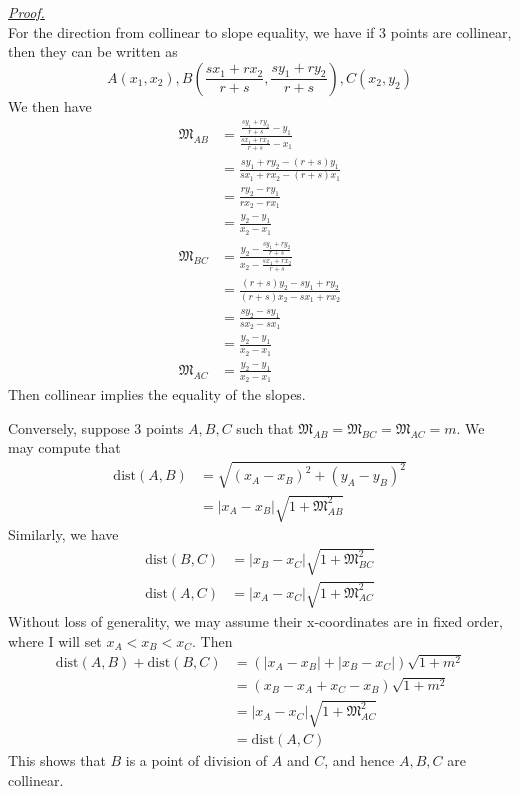 \documentclass[12pt]{article}
\renewenvironment{proof}[1][Proof]{\begin{snugshade*} \underline{\textit{{#1}.}}\\}{\hfill \qedsymbol \end{snugshade*}}
\begin{document}
    \begin{proof}
        For the direction from collinear to slope equality, we have if 3 points are collinear, then they can be written as $$A(x_1,x_2), B(\frac{sx_1+rx_2}{r+s}, \frac{sy_1+ry_2}{r+s}), C(x_2,y_2)$$
        We then have \begin{align*}
            \mathfrak{M}_{AB}&=\frac{\frac{sy_1+ry_2}{r+s}-y_1}{\frac{sx_1+rx_2}{r+s}-x_1}\\
            &=\frac{sy_1+ry_2-(r+s)y_1}{sx_1+rx_2-(r+s)x_1}\\
            &=\frac{ry_2-ry_1}{rx_2-rx_1}\\
            &=\frac{y_2-y_1}{x_2-x_1}\\
            \mathfrak{M}_{BC}&=\frac{y_2-\frac{sy_1+ry_2}{r+s}}{x_2-\frac{sx_1+rx_2}{r+s}}\\
            &=\frac{(r+s)y_2-sy_1+ry_2}{(r+s)x_2-sx_1+rx_2}\\
            &=\frac{sy_2-sy_1}{sx_2-sx_1}\\
            &=\frac{y_2-y_1}{x_2-x_1}\\
            \mathfrak{M}_{AC}&=\frac{y_2-y_1}{x_2-x_1}
        \end{align*}
        Then collinear implies the equality of the slopes.

        Conversely, suppose 3 points $A,B,C$ such that $\mathfrak{M}_{AB}=\mathfrak{M}_{BC}=\mathfrak{M}_{AC}=m$. We may compute that \begin{align*}
            \mathrm{dist}(A,B)&=\sqrt{(x_A-x_B)^2+(y_A-y_B)^2}\\
            &=|x_A-x_B|\sqrt{1+\mathfrak{M}_{AB}^2}
        \end{align*}
        Similarly, we have \begin{align*}
            \mathrm{dist}(B,C)&=|x_B-x_C|\sqrt{1+\mathfrak{M}_{BC}^2}\\
            \mathrm{dist}(A,C)&=|x_A-x_C|\sqrt{1+\mathfrak{M}_{AC}^2}
        \end{align*}
        Without loss of generality, we may assume their x-coordinates are in fixed order, where I will set $x_A<x_B<x_C$. Then \begin{align*}
            \mathrm{dist}(A,B)+\mathrm{dist}(B,C)&=(|x_A-x_B|+|x_B-x_C|)\sqrt{1+m^2}\\
            &=(x_B-x_A+x_C-x_B)\sqrt{1+m^2}\\
            &=|x_A-x_C|\sqrt{1+\mathfrak{M}_{AC}^2}\\
            &=\mathrm{dist}(A,C)
        \end{align*}
        This shows that $B$ is a point of division of $A$ and $C$, and hence $A,B,C$ are collinear.
    \end{proof}
\end{document}
